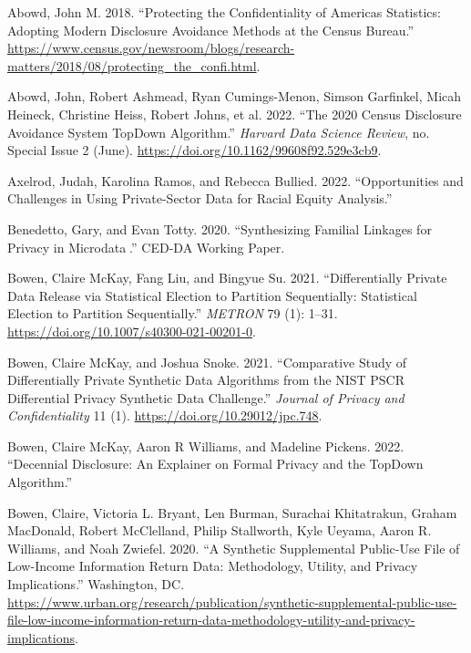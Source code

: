 \documentclass[
]{urban-formatting}
\newlength{\cslhangindent}
\newlength{\cslentryspacingunit} %
\newenvironment{CSLReferences}[2] %
 {%
  \setlength{\parindent}{0pt}
  \ifodd #1
  \let\oldpar\par
  \def\par{\hangindent=\cslhangindent\oldpar}
  \fi
  \setlength{\parskip}{#2\cslentryspacingunit}
 }%
 {}
\begin{document}
\hypertarget{refs}{}
\begin{CSLReferences}{1}{0}
\leavevmode{}%
Abowd, John M. 2018. {``Protecting the Confidentiality of Americas
Statistics: Adopting Modern Disclosure Avoidance Methods at the Census
Bureau.''}
\url{https://www.census.gov/newsroom/blogs/research-matters/2018/08/protecting_the_confi.html}.

\leavevmode{}%
Abowd, John, Robert Ashmead, Ryan Cumings-Menon, Simson Garfinkel, Micah
Heineck, Christine Heiss, Robert Johns, et al. 2022. {``The 2020 Census
Disclosure Avoidance System TopDown Algorithm.''} \emph{Harvard Data
Science Review}, no. Special Issue 2 (June).
\url{https://doi.org/10.1162/99608f92.529e3cb9}.

\leavevmode{}%
Axelrod, Judah, Karolina Ramos, and Rebecca Bullied. 2022.
{``Opportunities and Challenges in Using Private-Sector Data for Racial
Equity Analysis.''}

\leavevmode{}%
Benedetto, Gary, and Evan Totty. 2020. {``Synthesizing Familial Linkages
for Privacy in Microdata.''} CED-DA Working Paper.

\leavevmode{}%
Bowen, Claire McKay, Fang Liu, and Bingyue Su. 2021. {``Differentially
Private Data Release via Statistical Election to Partition Sequentially:
Statistical Election to Partition Sequentially.''} \emph{METRON} 79 (1):
1--31. \url{https://doi.org/10.1007/s40300-021-00201-0}.

\leavevmode{}%
Bowen, Claire McKay, and Joshua Snoke. 2021. {``Comparative Study of
Differentially Private Synthetic Data Algorithms from the NIST PSCR
Differential Privacy Synthetic Data Challenge.''} \emph{Journal of
Privacy and Confidentiality} 11 (1).
\url{https://doi.org/10.29012/jpc.748}.

\leavevmode{}%
Bowen, Claire McKay, Aaron R Williams, and Madeline Pickens. 2022.
{``Decennial Disclosure: An Explainer on Formal Privacy and the TopDown
Algorithm.''}

\leavevmode{}%
Bowen, Claire, Victoria L. Bryant, Len Burman, Surachai Khitatrakun,
Graham MacDonald, Robert McClelland, Philip Stallworth, Kyle Ueyama,
Aaron R. Williams, and Noah Zwiefel. 2020. {``A Synthetic Supplemental
Public-Use File of Low-Income Information Return Data: Methodology,
Utility, and Privacy Implications.''} Washington, DC.
\url{https://www.urban.org/research/publication/synthetic-supplemental-public-use-file-low-income-information-return-data-methodology-utility-and-privacy-implications}.


\end{CSLReferences}
\end{document}
